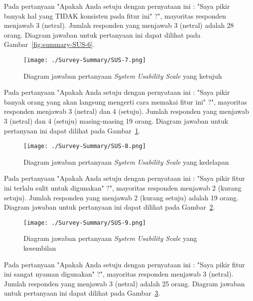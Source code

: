 Pada pertanyaan "Apakah Anda setuju dengan pernyataan ini : "Saya pikir banyak hal yang TIDAK konsisten pada fitur ini" ?", mayoritas responden menjawab 3 (netral). Jumlah responden yang menjawab 3 (netral) adalah 28 orang. Diagram jawaban untuk pertanyaan ini dapat dilihat pada Gambar~\ref{fig:summary-SUS-6}.

\begin{figure}[H]
	\centering  
	\texttt{[image: ./Survey-Summary/SUS-7.png]}
	\caption[Diagram jawaban pertanyaan \textit{System Usability Scale} yang ketujuh]{Diagram jawaban pertanyaan \textit{System Usability Scale} yang ketujuh} 
	\label{fig:summary-SUS-7} 
\end{figure}

Pada pertanyaan "Apakah Anda setuju dengan pernyataan ini : "Saya pikir banyak orang yang akan langsung mengerti cara memakai fitur ini" ?", mayoritas responden menjawab 3 (netral) dan 4 (setuju). Jumlah responden yang menjawab 3 (netral) dan 4 (setuju) masing-masing 19 orang. Diagram jawaban untuk pertanyaan ini dapat dilihat pada Gambar~\ref{fig:summary-SUS-7}.

\begin{figure}[H]
	\centering  
	\texttt{[image: ./Survey-Summary/SUS-8.png]}
	\caption[Diagram jawaban pertanyaan \textit{System Usability Scale} yang kedelapan]{Diagram jawaban pertanyaan \textit{System Usability Scale} yang kedelapan}
	\label{fig:summary-SUS-8} 
\end{figure}

Pada pertanyaan "Apakah Anda setuju dengan pernyataan ini : "Saya pikir fitur ini terlalu sulit untuk digunakan" ?", mayoritas responden menjawab 2 (kurang setuju). Jumlah responden yang menjawab 2 (kurang setuju) adalah 19 orang. Diagram jawaban untuk pertanyaan ini dapat dilihat pada Gambar~\ref{fig:summary-SUS-8}.

\begin{figure}[H]
	\centering  
	\texttt{[image: ./Survey-Summary/SUS-9.png]}
	\caption[Diagram jawaban pertanyaan \textit{System Usability Scale} yang kesembilan]{Diagram jawaban pertanyaan \textit{System Usability Scale} yang kesembilan} 
	\label{fig:summary-SUS-9} 
\end{figure}

Pada pertanyaan "Apakah Anda setuju dengan pernyataan ini : "Saya pikir fitur ini sangat nyaman digunakan" ?", mayoritas responden menjawab 3 (netral). Jumlah responden yang menjawab 3 (netral) adalah 25 orang. Diagram jawaban untuk pertanyaan ini dapat dilihat pada Gambar~\ref{fig:summary-SUS-9}.

